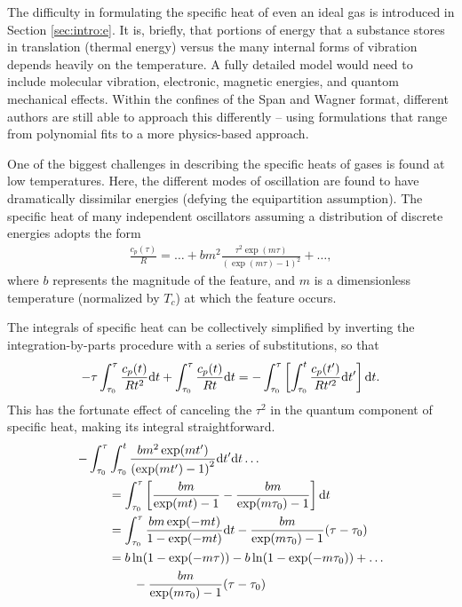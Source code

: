 The difficulty in formulating the specific heat of even an ideal gas is introduced in Section \ref{sec:intro:e}.  It is, briefly, that portions of energy that a substance stores in translation (thermal energy) versus the many internal forms of vibration depends heavily on the temperature.  A fully detailed model would need to include molecular vibration, electronic, magnetic energies, and quantom mechanical effects.  Within the confines of the Span and Wagner format, different authors are still able to approach this differently -- using formulations that range from polynomial fits to a more physics-based approach.

One of the biggest challenges in describing the specific heats of gases is found at low temperatures.  Here, the different modes of oscillation are found to have dramatically dissimilar energies (defying the equipartition assumption).  The specific heat of many independent oscillators assuming a distribution of discrete energies adopts the form
\begin{align}
\frac{c_p(\tau)}{R} = \ldots + b m^2 \frac{\tau^2 \exp(m\tau)}{\left(\exp(m\tau) - 1\right)^2} + \ldots\nonumber,
\end{align}
where $b$ represents the magnitude of the feature, and $m$ is a dimensionless temperature (normalized by $T_c$) at which the feature occurs.

The integrals of specific heat can be collectively simplified by inverting the integration-by-parts procedure with a series of substitutions, so that
\begin{align}
-\tau \int_{\tau_0}^\tau \frac{c_p(t)}{Rt^2} \mathrm{d} t + \int_{\tau_0}^\tau \frac{c_p(t)}{Rt} \mathrm{d} t = - \int_{\tau_0}^\tau \left[ \int_{\tau_0}^t \frac{c_p(t')}{Rt'^2} \mathrm{d} t'\right] \mathrm{d} t.
\end{align}
This has the fortunate effect of canceling the $\tau^2$ in the quantum component of specific heat, making its integral straightforward.
\begin{align}
-\int_{\tau_0}^\tau &\int_{\tau_0}^t \frac{b m^2 \exp(m t')}{\left(\exp(m t') - 1\right)^2} \mathrm{d} t' \mathrm{d} t  \ldots\nonumber\\
 &= \int_{\tau_0}^\tau \left[ \frac{b m}{\exp(m t) - 1} - \frac{b m}{\exp(m \tau_0) - 1} \right] \mathrm{d} t \nonumber\\
 &= \int_{\tau_0}^\tau \frac{b m\exp(-mt)}{1 - \exp(-mt)}\mathrm{d} t - \frac{b m}{\exp(m\tau_0)-1}(\tau - \tau_0) \nonumber\\
 &= b\ln(1-\exp(-m\tau)) - b\ln(1-\exp(-m\tau_0)) + \ldots\nonumber\\
 & \hspace{2em} -\frac{b m}{\exp(m\tau_0)-1}(\tau - \tau_0)
\end{align}

